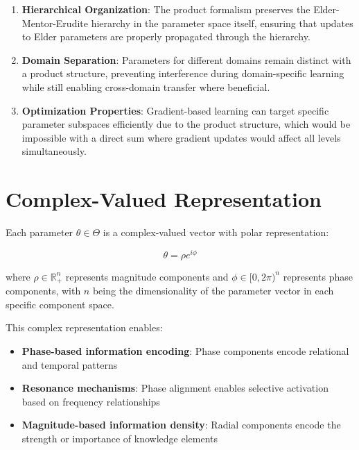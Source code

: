 \begin{definition}
\begin{enumerate}
    \item \textbf{Hierarchical Organization}: The product formalism preserves the Elder-Mentor-Erudite hierarchy in the parameter space itself, ensuring that updates to Elder parameters are properly propagated through the hierarchy.
    
    \item \textbf{Domain Separation}: Parameters for different domains remain distinct with a product structure, preventing interference during domain-specific learning while still enabling cross-domain transfer where beneficial.
    
    \item \textbf{Optimization Properties}: Gradient-based learning can target specific parameter subspaces efficiently due to the product structure, which would be impossible with a direct sum where gradient updates would affect all levels simultaneously.
\end{enumerate}
\end{definition}

\section{Complex-Valued Representation}

\begin{definition}
Each parameter $\theta \in \Theta$ is a complex-valued vector with polar representation:

\begin{equation}
\theta = \rho e^{i\phi}
\end{equation}

where $\rho \in \mathbb{R}^n_+$ represents magnitude components and $\phi \in [0, 2\pi)^n$ represents phase components, with $n$ being the dimensionality of the parameter vector in each specific component space.
\end{definition}

This complex representation enables:
\begin{itemize}
    \item \textbf{Phase-based information encoding}: Phase components encode relational and temporal patterns
    \item \textbf{Resonance mechanisms}: Phase alignment enables selective activation based on frequency relationships
    \item \textbf{Magnitude-based information density}: Radial components encode the strength or importance of knowledge elements
\end{itemize}

